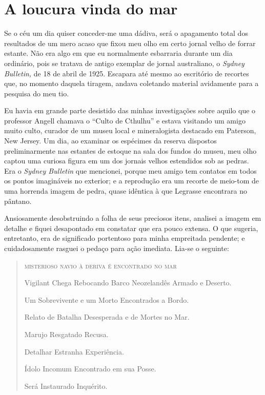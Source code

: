\chapter{A loucura vinda do mar}

\noindent{}Se o céu um dia quiser conceder-me uma dádiva, será o apagamento total
dos resultados de um mero acaso que fixou meu olho em certo jornal velho
de forrar estante. Não era algo em que eu normalmente esbarraria durante
um dia ordinário, pois se tratava de antigo exemplar de jornal
australiano, o \emph{Sydney Bulletin,} de 18 de abril de 1925. Escapara
até mesmo ao escritório de recortes que, no momento daquela tiragem,
andava coletando material avidamente para a pesquisa do meu tio.

Eu havia em grande parte desistido das minhas investigações sobre aquilo
que o professor Angell chamava o ``Culto de Cthulhu'' e estava
visitando um amigo muito culto, curador de um museu local e
mineralogista destacado em Paterson, New Jersey. Um dia, ao examinar os
espécimes da reserva dispostos preliminarmente nas estantes de estoque
na sala dos fundos do museu, meu olho captou uma curiosa figura em um
dos jornais velhos estendidos sob as pedras. Era o \emph{Sydney
Bulletin} que mencionei, porque meu amigo tem contatos em todos os
pontos imagináveis no exterior; e a reprodução era um recorte de
meio-tom de uma horrenda imagem de pedra, quase idêntica à que Legrasse
encontrara no pântano.

Ansiosamente desobstruindo a folha de seus preciosos itens, analisei 
a imagem em detalhe e fiquei desapontado em constatar que era pouco extensa. 
O que sugeria, entretanto, era de significado portentoso para minha
empreitada pendente; e cuidadosamente rasguei o pedaço para ação
imediata. Lia-se o seguinte:

\begin{quote}
\textsc{misterioso navio à deriva é encontrado no mar}

Vigilant Chega Rebocando Barco Neozelandês Armado e Deserto.

Um Sobrevivente e um Morto Encontrados a Bordo.

Relato de Batalha Desesperada e de Mortes no Mar.

Marujo Resgatado Recusa.

Detalhar Estranha Experiência.

Ídolo Incomum Encontrado em sua Posse.

Será Instaurado Inquérito.
\end{quote}


